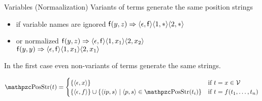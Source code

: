 \begin{example}{Variables (Normaalization)}
	Variants of terms generate the same position strings
	\begin{itemize}
		\item if variable names are ignored 
		\hfill${\mathsf f}(y,z) \Rightarrow
		\langle\epsilon,{\mathsf f}\rangle
		\langle1,*\rangle
		\langle2,*\rangle
		$
		
		\item or normalized 
		\hfill${\mathsf f}(y,z) \Rightarrow
		\langle\epsilon,{\mathsf f}\rangle
		\langle1,x_1\rangle
		\langle2,x_2\rangle$
		\\
		\hfill${\mathsf f}(y,y) \Rightarrow
		\langle\epsilon,{\mathsf f}\rangle
		\langle1,x_1\rangle
		\langle2,x_1\rangle
		$
	\end{itemize}
	
	In the first case even non-variants of terms generate the same strings.
\end{example}


\begin{definition}
	\begin{gather*}
	\PosStr(t) =  
	\begin{cases}
	\{ \ANGLES{\epsilon,x} \} 
	& \text{if }t=x\in\SIGV \\
	\{ \ANGLES{\epsilon, f} \} \cup \{ \ANGLES{ip,s}\mid \ANGLES{p,s} \in\PosStr(t_i)\} 
	&\text{if }t=f(t_1,\ldots,t_n)
	\end{cases}
	\end{gather*}
\end{definition}

